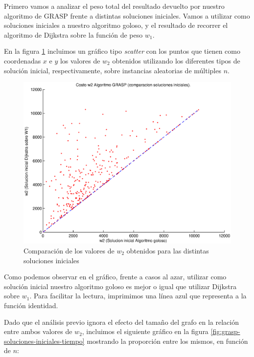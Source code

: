 Primero vamos a analizar el peso total del resultado devuelto por nuestro algoritmo de GRASP frente a distintas soluciones iniciales. Vamos a utilizar como soluciones iniciales a nuestro algoritmo goloso, y el resultado de recorrer el algoritmo de Dijkstra sobre la función de peso $w_1$.

En la figura \ref{fig:grasp-soluciones-iniciales} incluimos un gráfico tipo \emph{scatter} con los puntos que tienen como coordenadas $x$ e $y$ los valores de $w_2$ obtenidos utilizando los diferentes tipos de solución inicial, respectivamente, sobre instancias aleatorias de múltiples $n$.

\begin{figure}[H]
  \begin{center}
    \begin{minipage}{0.7\linewidth}
      \includegraphics[width=\linewidth]{graficos/grasp_comparacion_soluciones_iniciales.eps}
      \caption{Comparación de los valores de $w_2$ obtenidos para las distintas soluciones iniciales}\label{fig:grasp-soluciones-iniciales}
    \end{minipage}
  \end{center}
\end{figure}

Como podemos observar en el gráfico, frente a casos al azar, utilizar como solución inicial nuestro algoritmo goloso es mejor o igual que utilizar Dijkstra sobre $w_1$. Para facilitar la lectura, imprimimos una línea azul que representa a la función identidad.

Dado que el análisis previo ignora el efecto del tamaño del grafo en la relación entre ambos valores de $w_2$, incluimos el siguiente gráfico en la figura \ref{fig:grasp-soluciones-iniciales-tiempo} mostrando la proporción entre los mismos, en función de $n$:

